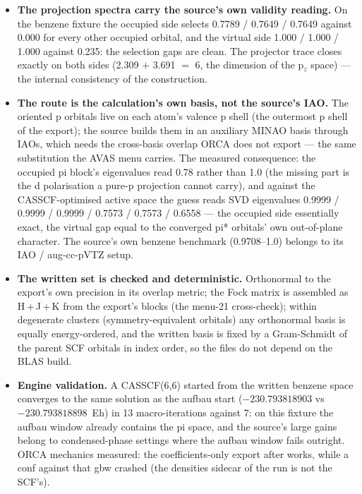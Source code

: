 \begin{readbox}
\begin{itemize}
  \item \textbf{The projection spectra carry the source's own validity
    reading.}  On the benzene fixture the occupied side selects 0.7789 /
    0.7649 / 0.7649 against 0.000 for every other occupied orbital, and
    the virtual side 1.000 / 1.000 / 1.000 against 0.235: the selection
    gaps are clean.  The projector trace closes exactly on both sides
    (2.309 $+$ 3.691 $=$ 6, the dimension of the p$_z$ space) --- the
    internal consistency of the construction.
  \item \textbf{The route is the calculation's own basis, not the source's
    IAO.}  The oriented p orbitals live on each atom's valence p shell
    (the outermost p shell of the export); the source builds them in an
    auxiliary MINAO basis through IAOs, which needs the cross-basis
    overlap ORCA does not export --- the same substitution the AVAS menu
    carries.  The measured consequence: the occupied pi block's
    eigenvalues read 0.78 rather than 1.0 (the missing part is the d
    polarisation a pure-p projection cannot carry), and against the
    CASSCF-optimised active space the guess reads SVD eigenvalues 0.9999 /
    0.9999 / 0.9999 / 0.7573 / 0.7573 / 0.6558 --- the occupied side
    essentially exact, the virtual gap equal to the converged pi*
    orbitals' own out-of-plane character.  The source's own benzene
    benchmark (0.9708--1.0) belongs to its IAO / aug-cc-pVTZ setup.
  \item \textbf{The written set is checked and deterministic.}  Orthonormal
    to the export's own precision in its overlap metric; the Fock matrix
    is assembled as H\,+\,J\,+\,K from the export's blocks (the menu-21
    cross-check); within degenerate clusters (symmetry-equivalent
    orbitals) any orthonormal basis is equally energy-ordered, and the
    written basis is fixed by a Gram-Schmidt of the parent SCF orbitals in
    index order, so the files do not depend on the BLAS build.
  \item \textbf{Engine validation.}  A CASSCF(6,6) started from the
    written benzene space converges to the same solution as the aufbau
    start ($-230.793818903$ vs $-230.793818898$~Eh) in 13
    macro-iterations against 7: on this fixture the aufbau window already
    contains the pi space, and the source's large gains belong to
    condensed-phase settings where the aufbau window fails outright.
    ORCA mechanics measured: the coefficients-only export after
     works, while a  conf against
    that gbw crashed  (the densities sidecar of the run
    is not the SCF's).
\end{itemize}
\end{readbox}

